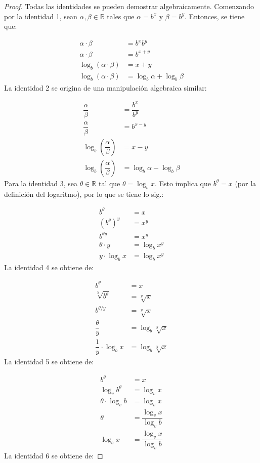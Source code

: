 \begin{proof}
Todas las identidades se pueden demostrar algebraicamente. Comenzando
por la identidad 1, sean $\alpha,\beta\in\mathbb{R}$ tales que $\alpha=b^{x}$
y $\beta=b^{y}$. Entonces, se tiene que:

\begin{align*}
\alpha\cdot\beta & =b^{x}b^{y}\\
\alpha\cdot\beta & =b^{x+y}\\
\log_{b}(\alpha\cdot\beta) & =x+y\\
\log_{b}(\alpha\cdot\beta) & =\log_{b}\alpha+\log_{b}\beta
\end{align*}
La identidad 2 se origina de una manipulación algebraica similar:

\begin{align*}
\dfrac{\alpha}{\beta} & =\dfrac{b^{x}}{b^{y}}\\
\dfrac{\alpha}{\beta} & =b^{x-y}\\
\log_{b}\left(\dfrac{\alpha}{\beta}\right) & =x-y\\
\log_{b}\left(\dfrac{\alpha}{\beta}\right) & =\log_{b}\alpha-\log_{b}\beta
\end{align*}
Para la identidad 3, sea $\theta\in\mathbb{R}$ tal que $\theta=\log_{b}x$.
Esto implica que $b^{\theta}=x$ (por la definición del logaritmo),
por lo que se tiene lo sig.:

\begin{align*}
b^{\theta} & =x\\
(b^{\theta})^{y} & =x^{y}\\
b^{\theta y} & =x^{y}\\
\theta\cdot y & =\log_{b}x^{y}\\
y\cdot\log_{b}x & =\log_{b}x^{y}
\end{align*}
La identidad 4 se obtiene de:

\begin{align*}
b^{\theta} & =x\\
\sqrt[y]{b^{\theta}} & =\sqrt[y]{x}\\
b^{\theta/y} & =\sqrt[y]{x}\\
\dfrac{\theta}{y} & =\log_{b}\sqrt[y]{x}\\
\dfrac{1}{y}\cdot\log_{b}x & =\log_{b}\sqrt[y]{x}
\end{align*}
La identidad 5 se obtiene de:

\begin{align*}
b^{\theta} & =x\\
\log_{v}b^{\theta} & =\log_{v}x\\
\theta\cdot\log_{v}b & =\log_{v}x\\
\theta & =\dfrac{\log_{v}x}{\log_{v}b}\\
\log_{b}x & =\dfrac{\log_{v}x}{\log_{v}b}
\end{align*}
La identidad 6 se obtiene de:


\end{proof}

